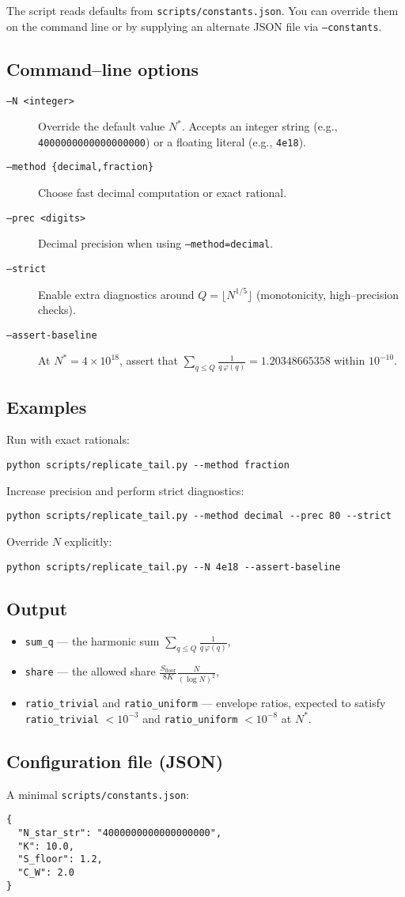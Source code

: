 \documentclass[11pt]{article}
\theoremstyle{remark}
\begin{document}
The script reads defaults from \texttt{scripts/constants.json}. You can override
them on the command line or by supplying an alternate JSON file via \texttt{--constants}.

\subsection*{Command--line options}
\begin{description}
  \item[\texttt{--N \textless integer\textgreater}] Override the default value $N^*$.
        Accepts an integer string (e.g., \texttt{4000000000000000000}) or a floating literal (e.g., \texttt{4e18}).
  \item[\texttt{--method \{decimal,fraction\}}] Choose fast decimal computation or exact rational.
  \item[\texttt{--prec \textless digits\textgreater}] Decimal precision when using \texttt{--method=decimal}.
  \item[\texttt{--strict}] Enable extra diagnostics around $Q=\lfloor N^{1/5}\rfloor$ (monotonicity, high--precision checks).
  \item[\texttt{--assert-baseline}] At $N^*=4\times 10^{18}$, assert that $\sum_{q\le Q}\frac{1}{q\,\varphi(q)}=1.20348665358$ within $10^{-10}$.
\end{description}

\subsection*{Examples}
Run with exact rationals:
\begin{verbatim}
python scripts/replicate_tail.py --method fraction
\end{verbatim}

Increase precision and perform strict diagnostics:
\begin{verbatim}
python scripts/replicate_tail.py --method decimal --prec 80 --strict
\end{verbatim}

Override $N$ explicitly:
\begin{verbatim}
python scripts/replicate_tail.py --N 4e18 --assert-baseline
\end{verbatim}

\subsection*{Output}
\begin{itemize}
  \item \texttt{sum\_q} --- the harmonic sum $\displaystyle \sum_{q\le Q}\frac{1}{q\,\varphi(q)}$,
  \item \texttt{share} --- the allowed share $\displaystyle \frac{S_{\text{floor}}}{8K}\frac{N}{(\log N)^2}$,
  \item \texttt{ratio\_trivial} and \texttt{ratio\_uniform} --- envelope ratios, expected to satisfy
        \texttt{ratio\_trivial} $<10^{-3}$ and \texttt{ratio\_uniform} $<10^{-8}$ at $N^*$.
\end{itemize}

\subsection*{Configuration file (JSON)}
A minimal \texttt{scripts/constants.json}:
\begin{verbatim}
{
  "N_star_str": "4000000000000000000",
  "K": 10.0,
  "S_floor": 1.2,
  "C_W": 2.0
}
\end{verbatim}
\end{document}

